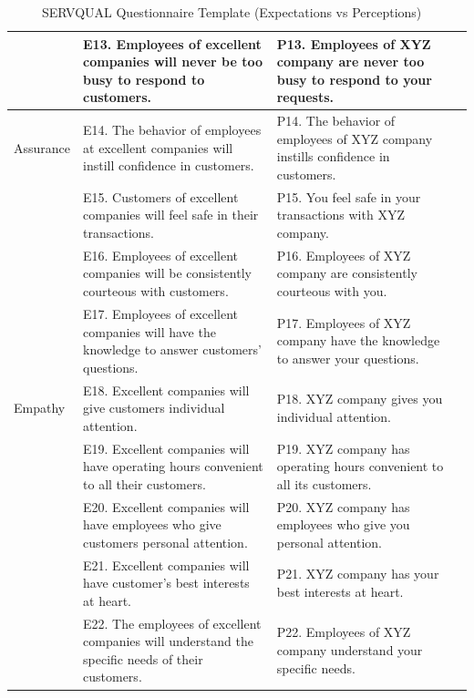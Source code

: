 \begin{table}[ht]
\begin{tabular}{p{2.5cm} p{6cm} p{6cm} p{1.5cm}}
 & E13. Employees of excellent companies will never be too busy to respond to customers. & P13. Employees of XYZ company are never too busy to respond to your requests. & \\
\hline
Assurance & E14. The behavior of employees at excellent companies will instill confidence in customers. & P14. The behavior of employees of XYZ company instills confidence in customers. & \\
 & E15. Customers of excellent companies will feel safe in their transactions. & P15. You feel safe in your transactions with XYZ company. & \\
 & E16. Employees of excellent companies will be consistently courteous with customers. & P16. Employees of XYZ company are consistently courteous with you. & \\
 & E17. Employees of excellent companies will have the knowledge to answer customers’ questions. & P17. Employees of XYZ company have the knowledge to answer your questions. & \\
\hline
Empathy & E18. Excellent companies will give customers individual attention. & P18. XYZ company gives you individual attention. & \\
 & E19. Excellent companies will have operating hours convenient to all their customers. & P19. XYZ company has operating hours convenient to all its customers. & \\
 & E20. Excellent companies will have employees who give customers personal attention. & P20. XYZ company has employees who give you personal attention. & \\
 & E21. Excellent companies will have customer’s best interests at heart. & P21. XYZ company has your best interests at heart. & \\
 & E22. The employees of excellent companies will understand the specific needs of their customers. & P22. Employees of XYZ company understand your specific needs. & \\
\hline
\end{tabular}
\caption{SERVQUAL Questionnaire Template (Expectations vs Perceptions) ~\cite{master_servqual_model}} 
\label{tab:servqual_template}
\end{table}



